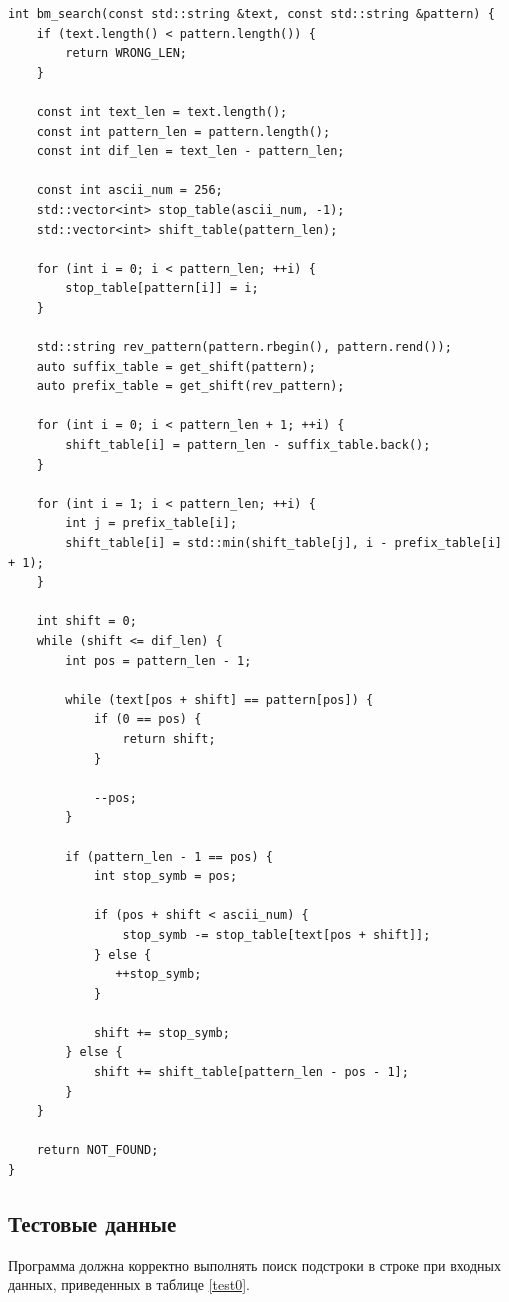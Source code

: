 \documentclass[a4paper,12pt]{article}
\begin{document}
\begin{lstlisting}[label=lst2,caption=Реализация
алгоритма Бойера-Мура]
int bm_search(const std::string &text, const std::string &pattern) {
    if (text.length() < pattern.length()) {
        return WRONG_LEN;
    }

    const int text_len = text.length();
    const int pattern_len = pattern.length();
    const int dif_len = text_len - pattern_len;

    const int ascii_num = 256;
    std::vector<int> stop_table(ascii_num, -1);
    std::vector<int> shift_table(pattern_len);

    for (int i = 0; i < pattern_len; ++i) {
        stop_table[pattern[i]] = i;
    }

    std::string rev_pattern(pattern.rbegin(), pattern.rend());
    auto suffix_table = get_shift(pattern);
    auto prefix_table = get_shift(rev_pattern);

    for (int i = 0; i < pattern_len + 1; ++i) {
        shift_table[i] = pattern_len - suffix_table.back();
    }

    for (int i = 1; i < pattern_len; ++i) {
        int j = prefix_table[i];
        shift_table[i] = std::min(shift_table[j], i - prefix_table[i] + 1);
    }

    int shift = 0;
    while (shift <= dif_len) {
        int pos = pattern_len - 1;

        while (text[pos + shift] == pattern[pos]) {
            if (0 == pos) {
                return shift;
            }

            --pos;
        }

        if (pattern_len - 1 == pos) {
            int stop_symb = pos;

            if (pos + shift < ascii_num) {
                stop_symb -= stop_table[text[pos + shift]];
            } else {
               ++stop_symb;
            }

            shift += stop_symb;
        } else {
            shift += shift_table[pattern_len - pos - 1];
        }
    }

    return NOT_FOUND;
}
\end{lstlisting}

\subsection{Тестовые данные}
\label{fig:test_data}

Программа должна корректно выполнять поиск подстроки в строке при входных данных, приведенных в таблице \ref{test0}.
\end{document}
